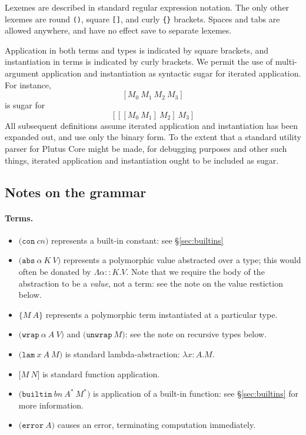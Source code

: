 \documentclass[a4paper]{article}
\newcommand{\keyword}[1]{\texttt{#1}}
\newcommand{\construct}[1]{\texttt{(} #1 \texttt{)}}
\newcommand{\con}[1]{\construct{\keyword{con} ~ #1}}
\newcommand{\abs}[3]{\construct{\keyword{abs} ~ #1 ~ #2 ~ #3}}
\newcommand{\inst}[2]{\texttt{\{}#1 ~ #2\texttt{\}}}
\newcommand{\lam}[3]{\construct{\keyword{lam} ~ #1 ~ #2 ~ #3}}
\newcommand{\app}[2]{\texttt{[} #1 ~ #2 \texttt{]}}
\newcommand{\wrap}[3]{\construct{\keyword{wrap} ~ #1 ~ #2 ~ #3}}
\newcommand{\unwrap}[1]{\construct{\keyword{unwrap} ~ #1}}
\newcommand{\builtin}[3]{\construct{\keyword{builtin} ~ #1 ~ #2 ~ #3}}
\newcommand{\error}[1]{\construct{\keyword{error} ~ #1}}
\newcommand{\appT}[2]{\texttt{[} #1 ~ #2 \texttt{]}}
\begin{document}
Lexemes are described in standard regular expression notation.  The only other
lexemes are round \texttt{()}, square \texttt{[]}, and curly \texttt{\{\}}
brackets.  Spaces and tabs are allowed anywhere, and have no effect
save to separate lexemes.

Application in both terms and types is indicated by square
brackets, and instantiation in terms is indicated by curly brackets. We
permit the use of multi-argument application and instantiation as
syntactic sugar for iterated application.
For instance,
\[
  [M_0 ~ M_1 ~ M_2 ~ M_3]
\]
is sugar for
\[
  [[[M_0 ~ M_1] ~ M_2] ~ M_3]
\]
All subsequent definitions assume iterated application and instantiation
has been expanded out, and use only the binary form. To the extent that
a standard utility parser for Plutus Core might be made, for debugging
purposes and other such things, iterated application and instantiation
ought to be included as sugar.






\newcommand\fixtype[1]{\mu\,\alpha.#1}  %

\subsection{Notes on the grammar}
\paragraph{Terms.}
\begin{itemize}
\item $\con{cn}$ represents a built-in constant: see \S\ref{sec:builtins}
\item $\abs{\alpha}{K}{V}$ represents a polymorphic value abstracted
  over a type; this would often be donated by $\Lambda\alpha{::}K.V$.
  Note that we require the body of the abstraction to be a
  \textit{value}, not a term: see the note on the value restiction below.
\item $\inst{M}{A}$ represents a polymorphic term instantiated at a particular type.
\item $\wrap{\alpha}{A}{V}$ and $\unwrap{M}$: see the note on recursive types below.
\item $\lam{x}{A}{M}$ is standard lambda-abstraction: $\lambda{}x{:}{A}.{M}$.
\item $\app{M}{N}$ is standard function application.
\item $\builtin{bn}{A^*}{M^*}$ is application of a built-in function: see \S\ref{sec:builtins} for more information.
\item $\error{A}$ causes an error, terminating computation immediately.
\end{itemize}
\end{document}
